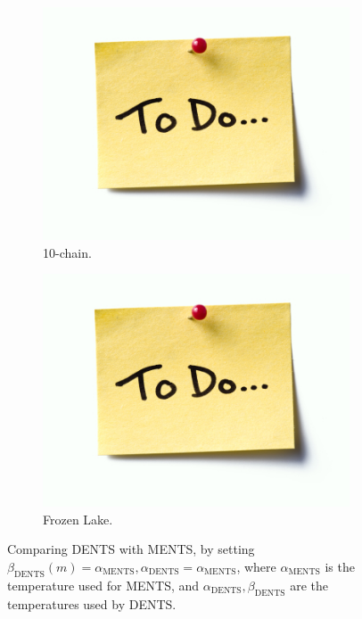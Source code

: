         
        \begin{figure}
            \centering
            \begin{subfigure}[b]{0.49\textwidth}
                \centering
                \includegraphics[width=\textwidth]{figures/todo.jpg}
                \caption{10-chain.}
            \end{subfigure}
            \begin{subfigure}[b]{0.49\textwidth}
                \centering
                \includegraphics[width=\textwidth]{figures/todo.jpg}
                \caption{Frozen Lake.}
            \end{subfigure}
            \caption{Comparing DENTS with MENTS, by setting $\beta_{\text{DENTS}}(m)=\alpha_{\text{MENTS}}, \alpha_{\text{DENTS}}=\alpha_{\text{MENTS}}$, where $\alpha_{\text{MENTS}}$ is the temperature used for MENTS, and $\alpha_{\text{DENTS}},\beta_{\text{DENTS}}$ are the temperatures used by DENTS. }
            \label{fig:dbments}
        \end{figure}










